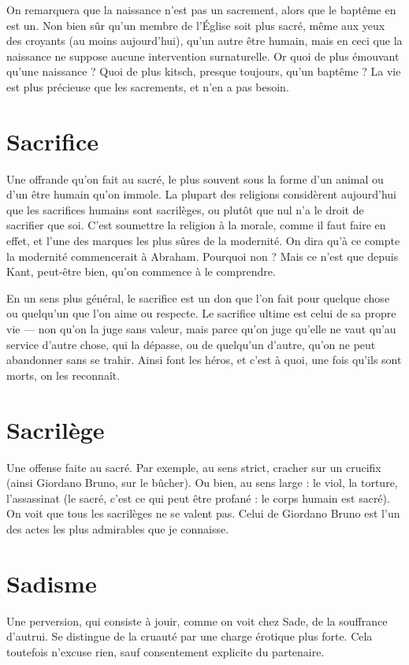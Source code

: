 On remarquera que la naissance n’est pas un sacrement, alors que le baptême
en est un. Non bien sûr qu’un membre de l’Église soit plus sacré, même
aux yeux des croyants (au moins aujourd’hui), qu’un autre être humain, mais
en ceci que la naissance ne suppose aucune intervention surnaturelle. Or quoi
de plus émouvant qu’une naissance ? Quoi de plus kitsch, presque toujours,
qu’un baptême ? La vie est plus précieuse que les sacrements, et n'en a pas
besoin.

\section{Sacrifice}
Une offrande qu’on fait au sacré, le plus souvent sous la forme
d’un animal ou d’un être humain qu’on immole. La plupart des
religions considèrent aujourd’hui que les sacrifices humains sont sacrilèges, ou
plutôt que nul n’a le droit de sacrifier que soi. C’est soumettre la religion à la
morale, comme il faut faire en effet, et l’une des marques les plus sûres de la
modernité. On dira qu’à ce compte la modernité commencerait à Abraham.
Pourquoi non ? Mais ce n’est que depuis Kant, peut-être bien, qu'on commence
à le comprendre.

En un sens plus général, le sacrifice est un don que l’on fait pour quelque
chose ou quelqu'un que l’on aime ou respecte. Le sacrifice ultime est celui de
sa propre vie — non qu’on la juge sans valeur, mais parce qu’on juge qu’elle ne
vaut qu’au service d’autre chose, qui la dépasse, ou de quelqu'un d’autre, qu'on
ne peut abandonner sans se trahir. Ainsi font les héros, et c’est à quoi, une fois
qu'ils sont morts, on les reconnaît.

\section{Sacrilège}
Une offense faite au sacré. Par exemple, au sens strict, cracher
sur un crucifix (ainsi Giordano Bruno, sur le bûcher). Ou bien,
au sens large : le viol, la torture, l'assassinat (le sacré, c’est ce qui peut être
profané : le corps humain est sacré). On voit que tous les sacrilèges ne se valent
pas. Celui de Giordano Bruno est l’un des actes les plus admirables que je
connaisse.

\section{Sadisme}
Une perversion, qui consiste à jouir, comme on voit chez Sade,
de la souffrance d’autrui. Se distingue de la cruauté par une
charge érotique plus forte. Cela toutefois n’excuse rien, sauf consentement
explicite du partenaire.

